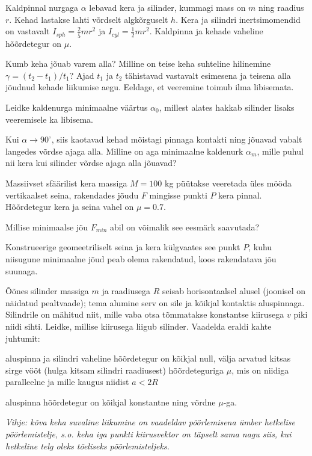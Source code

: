 \documentclass[a4paper,11pt,twocolumn]{article}
\begin{document}
\begin{question}[E-S 2013, P6]
	Kaldpinnal nurgaga $ \alpha $ lebavad kera ja silinder, kummagi mass on $ m $ ning raadius $ r $. Kehad lastakse lahti võrdselt algkõrguselt $ h $. Kera ja silindri inertsimomendid on vastavalt $ I_{sph}=\frac{2}{5}mr^2 $ ja $ I_{cyl}=\frac{1}{2}mr^{2} $. Kaldpinna ja kehade vaheline hõõrdetegur on $ \mu $.
	\begin{subquestion}
		\item Kumb keha jõuab varem alla? Milline on teise keha suhteline hilinemine $ \gamma = (t_2 − t_1)/t_1 $? Ajad $ t_1 $ ja $ t_2 $ tähistavad vastavalt esimesena ja teisena alla jõudnud kehade liikumise aegu. Eeldage, et veeremine toimub ilma libisemata.
		\item Leidke kaldenurga minimaalne väärtus $ \alpha_0 $, millest alates hakkab silinder lisaks veeremisele ka libisema.
		\item Kui $ \alpha \rightarrow  90^\circ$, siis kaotavad	kehad mõistagi pinnaga kontakti ning jõuavad vabalt langedes võrdse ajaga alla. Milline on aga minimaalne kaldenurk $ \alpha_m $, mille puhul nii kera kui silinder võrdse ajaga alla jõuavad?
	\end{subquestion}
\end{question}
\begin{question}[E-S 2010, P4]
	Massiivset sfäärilist kera massiga $ M = 100 $ kg püütakse veeretada üles mööda vertikaalset seina, rakendades jõudu $ F $ mingisse punkti $ P $ kera pinnal. Hõõrdetegur kera ja seina vahel on $  \mu = 0.7 $.
	\begin{subquestion}
		\item Millise minimaalse jõu $ F_{min} $ abil on võimalik see eesmärk
		saavutada?

		\item Konstrueerige geomeetriliselt seina ja kera külgvaates see punkt $ P $, kuhu niisugune minimaalne jõud peab olema rakendatud, koos rakendatava jõu suunaga.
	\end{subquestion}
\end{question}
\begin{question}[Lõppv 1998, G9][sta4][6cm]
	Õõnes silinder massiga $ m $ ja raadiusega $ R $ seisab horisontaalsel alusel (joonisel on näidatud pealtvaade); tema alumine serv on sile ja kõikjal kontaktis aluspinnaga. Silindrile on mähitud niit, mille vaba otsa tõmmatakse konstantse kiirusega $ v $ piki niidi sihti. Leidke, millise kiirusega liigub silinder. Vaadelda eraldi kahte juhtumit:
	\begin{subquestion}
		\item aluspinna ja silindri vaheline hõõrdetegur on kõikjal null, välja arvatud kitsas sirge vööt (hulga kitsam silindri raadiusest) hõõrdeteguriga $ \mu $, mis on niidiga paralleelne ja mille kaugus niidist $ a < 2R $
		\item aluspinna hõõrdetegur on kõikjal konstantne ning võrdne $ \mu $-ga.
	\end{subquestion}\setlength{\parskip}{0pt}
	\textit{Vihje: kõva keha suvaline liikumine on vaadeldav pöörlemisena ümber hetkelise pöörlemistelje, s.o. keha iga punkti kiirusvektor on täpselt sama nagu siis, kui
	hetkeline telg oleks tõeliseks pöörlemisteljeks.}
\end{question}
\end{document}
